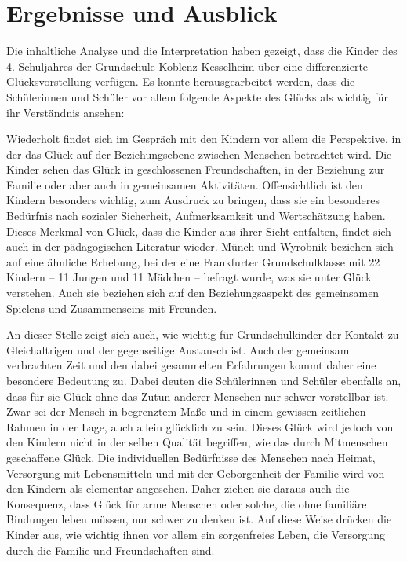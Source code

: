 \section{Ergebnisse und Ausblick}

Die inhaltliche Analyse und die Interpretation haben gezeigt, dass die Kinder des 4. Schuljahres der Grundschule Koblenz-Kesselheim über eine differenzierte Glücksvorstellung verfügen. 
Es konnte herausgearbeitet werden, dass die Schülerinnen und Schüler vor allem folgende Aspekte des Glücks als wichtig für ihr Verständnis ansehen:

Wiederholt findet sich im Gespräch mit den Kindern vor allem die Perspektive, in der das Glück auf der Beziehungsebene zwischen Menschen betrachtet wird. 
Die Kinder sehen das Glück in geschlossenen Freundschaften, in der Beziehung zur Familie oder aber auch in gemeinsamen Aktivitäten. 
Offensichtlich ist den Kindern besonders wichtig, zum Ausdruck zu bringen, dass sie ein besonderes Bedürfnis nach sozialer Sicherheit, Aufmerksamkeit und Wertschätzung haben. 
Dieses Merkmal von Glück, dass die Kinder aus ihrer Sicht entfalten, findet sich auch in der pädagogischen Literatur wieder. 
Münch und Wyrobnik beziehen sich auf eine ähnliche Erhebung, bei der eine Frankfurter Grundschulklasse mit 22 Kindern -- 11 Jungen und 11 Mädchen -- befragt wurde, was sie unter Glück verstehen. 
Auch sie beziehen sich auf den Beziehungsaspekt des gemeinsamen Spielens und Zusammenseins mit Freunden\cite[S.\,62]{JM11}.

An dieser Stelle zeigt sich auch, wie wichtig für Grundschulkinder der Kontakt zu Gleichaltrigen und der gegenseitige Austausch ist. 
Auch der gemeinsam verbrachten Zeit und den dabei gesammelten Erfahrungen kommt daher eine besondere Bedeutung zu. 
Dabei deuten die Schülerinnen und Schüler ebenfalls an, dass für sie Glück ohne das Zutun anderer Menschen nur schwer vorstellbar ist. 
Zwar sei der Mensch in begrenztem Maße und in einem gewissen zeitlichen Rahmen in der Lage, auch allein glücklich zu sein. 
Dieses Glück wird jedoch von den Kindern nicht in der selben Qualität begriffen, wie das durch Mitmenschen geschaffene Glück. 
Die individuellen Bedürfnisse des Menschen nach Heimat, Versorgung mit Lebensmitteln und mit der Geborgenheit der Familie wird von den Kindern als elementar angesehen. 
Daher ziehen sie daraus auch die Konsequenz, dass Glück für arme Menschen oder solche, die ohne familiäre Bindungen leben müssen, nur schwer zu denken ist. 
Auf diese Weise drücken die Kinder aus, wie wichtig ihnen vor allem ein sorgenfreies Leben, die Versorgung durch die Familie und Freundschaften sind. 

